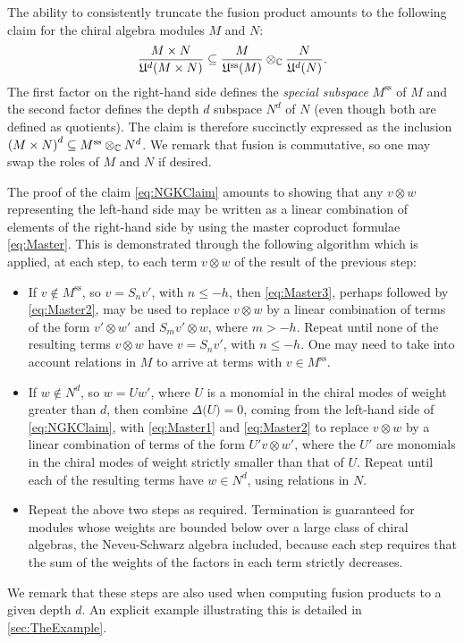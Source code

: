 \documentclass[a4paper,reqno,12pt]{report}
\theoremstyle{definition}
\numberwithin{equation}{section}
\let\originalleft\left     %
\let\originalright\right
\renewcommand{\left}{\mathopen{}\mathclose\bgroup\originalleft}
\renewcommand{\right}{\aftergroup\egroup\originalright}
\newcommand{\alg}[1]{\mathfrak{#1}} %
\newcommand{\func}[2]{#1 \left( #2 \right)} %
\newcommand{\brac}[1]{\left( #1 \right)}
\newcommand{\CC}{\mathbb{C}}
\newcommand{\spsub}[1]{#1^{\text{ss}}}       %
\newcommand{\fuse}{\mathbin{\times}}                                            %
\newcommand{\coproductsymb}{\Delta}                                                %
\newcommand{\coproduct}[1]{\coproductsymb \bigl( #1 \bigr)}                        %
\newcommand{\lhs}{left-hand side}
\newcommand{\rhs}{right-hand side}
\newcommand{\ns}{Neveu-Schwarz}
\theoremstyle{plain}
\begin{document}
The ability to consistently truncate the fusion product amounts to the following claim \cite{NahQua94,GabInd96} for the chiral algebra modules $M$ and $N$:
\begin{equation} \label{eq:NGKClaim}
\frac{M \fuse N}{\func{\alg{U}^d}{M \fuse N}} \subseteq \frac{M}{\func{\spsub{\alg{U}}}{M}} \otimes_{\CC} \frac{N}{\func{\alg{U}^d}{N}}.
\end{equation}
The first factor on the \rhs{} defines the \emph{special subspace} $\spsub{M}$ of $M$ and the second factor defines the depth $d$ subspace $N^d$ of $N$ (even though both are defined as quotients).  The claim is therefore succinctly expressed as the inclusion $\brac{M \fuse N}^d \subseteq \spsub{M} \otimes_{\CC} N^d$.  We remark that fusion is commutative, so one may swap the roles of $M$ and $N$ if desired.

The proof of the claim \eqref{eq:NGKClaim} amounts to showing that any $v \otimes w$ representing the \lhs{} may be written as a linear combination of elements of the \rhs{} by using the master coproduct formulae \eqref{eq:Master}.  This is demonstrated through the following algorithm which is applied, at each step, to each term $v \otimes w$ of the result of the previous step:
\begin{itemize}
\item If $v \notin \spsub{M}$, so $v = S_n v'$, with $n \leq -h$, then \eqref{eq:Master3}, perhaps followed by \eqref{eq:Master2}, may be used to replace $v \otimes w$ by a linear combination of terms of the form $v' \otimes w'$ and $S_m v' \otimes w$, where $m > -h$.  Repeat until none of the resulting terms $v \otimes w$ have $v = S_n v'$, with $n \leq -h$.  One may need to take into account relations in $M$ to arrive at terms with $v \in \spsub{M}$.
\item If $w \notin N^d$, so $w = U w'$, where $U$ is a monomial in the chiral modes of weight greater than $d$, then combine $\coproduct{U} = 0$, coming from the \lhs{} of \eqref{eq:NGKClaim}, with \eqref{eq:Master1} and \eqref{eq:Master2} to replace $v \otimes w$ by a linear combination of terms of the form $U' v \otimes w'$, where the $U'$ are monomials in the chiral modes of weight strictly smaller than that of $U$.  Repeat until each of the resulting terms have $w \in N^d$, using relations in $N$.
\item Repeat the above two steps as required.  Termination is guaranteed for modules whose weights are bounded below over a large class of chiral algebras, the \ns{} algebra included, because each step requires that the sum of the weights of the factors in each term strictly decreases.
\end{itemize}
We remark that these steps are also used when computing fusion products to a given depth $d$.  An explicit example illustrating this is detailed in \cref{sec:TheExample}.
\end{document}
